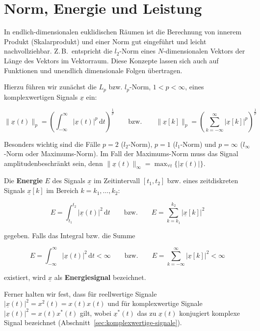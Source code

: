 \section{Norm, Energie und Leistung}
\label{sec:norm-energie-leistung}

In endlich-dimensionalen euklidischen Räumen ist die Berechnung von innerem Produkt (Skalarprodukt) und einer Norm gut eingeführt und leicht nachvollziehbar. Z.\,B.\ entspricht die $l_2$-Norm eines $N$-dimensionalen Vektors der Länge des Vektors im Vektorraum. Diese Konzepte lassen sich auch auf Funktionen und unendlich dimensionale Folgen übertragen.

Hierzu führen wir zunächst die $L_p$ bzw. $l_p$-Norm, $1 < p < \infty$, eines komplexwertigen Signals $\underline{x}$ ein:

$$
\|\underline{x}(t)\|_p = \left(\int_{-\infty}^{\infty} |\underline{x}(t)|^p\,\mathrm{d}t\right)^{\!\frac{1}{p}}
\qquad \text{bzw.} \qquad
\|\underline{x}[k]\|_p = \left(\sum_{k=-\infty}^{\infty} |\underline{x}[k]|^p\right)^{\!\frac{1}{p}}
$$

Besonders wichtig sind die Fälle $p = 2$ ($l_2$-Norm), $p = 1$ ($l_1$-Norm) und $p = \infty$ ($l_\infty$-Norm oder Maximums-Norm). Im Fall der Maximums-Norm muss das Signal amplitudenbeschränkt sein, denn $\|\underline{x}(t)\|_\infty = \max_{\forall t}\{|\underline{x}(t)|\}$.

\begin{definition}
Die \textbf{Energie} $E$ des Signals $\underline{x}$ im Zeitintervall $[t_1, t_2]$ bzw. eines zeitdiskreten
Signals $\underline{x}[k]$ im Bereich $k = k_1, \ldots, k_2$:

$$
E = \int_{t_1}^{t_2} |\underline{x}(t)|^2\,\mathrm{d}t
\qquad \text{bzw.} \qquad
E = \sum_{k=k_1}^{k_2} |\underline{x}[k]|^2
$$

gegeben. Falls das Integral bzw. die Summe

$$
E = \int_{-\infty}^{\infty} |\underline{x}(t)|^2\,\mathrm{d}t < \infty
\qquad \text{bzw.} \qquad
E = \sum_{k=-\infty}^{\infty} |\underline{x}[k]|^2 < \infty
$$

existiert, wird $\underline{x}$ als \textbf{Energiesignal} bezeichnet.
\end{definition}


Ferner halten wir fest, dass für reellwertige Signale $|\underline{x}(t)|^2 = x^2(t) = x(t)x(t)$
und für komplexwertige Signale $|\underline{x}(t)|^2 = x(t)x^*(t)$ gilt, wobei $\underline{x}^*(t)$ das zu $\underline{x}(t)$
konjugiert komplexe Signal bezeichnet (Abschnitt~\ref{sec:komplexwertige-signale}).

